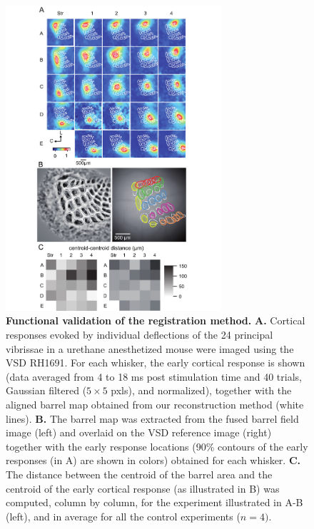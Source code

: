 


\begin{figure}[h!]
\centering
	\includegraphics[width=80mm]{images/Perronnet-Figure5} %
\caption{
	\textbf{Functional validation of the registration method.}
	\textbf{A.} Cortical responses evoked by individual deflections of the 24 principal vibrissae in a urethane anesthetized mouse were imaged using the VSD RH1691. For each whisker, the early cortical response is shown (data averaged from 4 to 18 ms post stimulation time and 40 trials, Gaussian filtered ($5 \times 5$ pxls), and normalized), together with the aligned barrel map obtained from our reconstruction method (white lines). 
	\textbf{B.} The barrel map was extracted from the fused barrel field image (left) and overlaid on the VSD reference image (right) together with the early response locations (90\% contours of the early responses (in A) are shown in colors) obtained for each whisker. 
	\textbf{C.} The distance between the centroid of the barrel area and the centroid of the early cortical response (as illustrated in B) was computed, column by column, for the experiment illustrated in A-B (left), and in average for all the control experiments ($n = 4)$.
}
\label{fig-func-validation}  
\end{figure}


